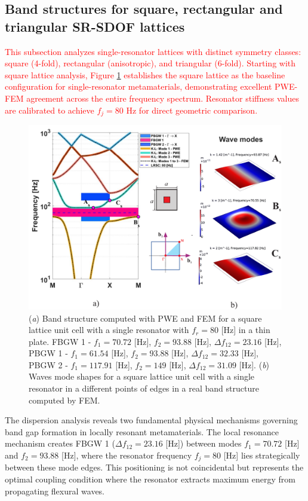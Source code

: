\documentclass[review,numbers,sort&compress]{elsarticle}
\begin{document}
\subsection{Band structures for square, rectangular and triangular SR-SDOF lattices}
\label{srt_disp_pwe}
\textcolor{red}{This subsection analyzes single-resonator lattices with distinct symmetry classes: square (4-fold), rectangular (anisotropic), and triangular (6-fold). Starting with square lattice analysis, Figure \ref{pwe_fem_disp_modal_square} establishes the square lattice as the baseline configuration for single-resonator metamaterials, demonstrating excellent PWE-FEM agreement across the entire frequency spectrum. Resonator stiffness values are calibrated to achieve $f_j = 80$ Hz for direct geometric comparison.}

\begin{figure}[htb]
	\centering
	\includegraphics[width=.8\textwidth]{1_1_disp_frf_square.pdf}
	\caption{(\textit{a}) Band structure computed with PWE and FEM for a square lattice unit cell with a single resonator with $f_r = 80$ [Hz] in a thin plate. FBGW 1 - $f_1 = 70.72$ [Hz], $f_2 = 93.88$ [Hz], $\Delta f_{12} = 23.16 $ [Hz], PBGW 1 - $f_1 = 61.54$ [Hz], $f_2 = 93.88$ [Hz], $\Delta f_{12} = 32.33 $ [Hz], PBGW 2 - $f_1 = 117.91$ [Hz], $f_2 = 149$ [Hz], $\Delta f_{12} = 31.09 $ [Hz]. (\textit{b}) Waves mode shapes for a square lattice unit cell with a single resonator in a different points of edges in a real band structure computed by FEM.}
	\label{pwe_fem_disp_modal_square}
\end{figure}
The dispersion analysis reveals two fundamental physical mechanisms governing band gap formation in locally resonant metamaterials. The local resonance mechanism creates FBGW 1 ($\Delta f_{12} = 23.16$ [Hz]) between modes $f_1 = 70.72$ [Hz] and $f_2 = 93.88$ [Hz], where the resonator frequency $f_j = 80$ [Hz] lies strategically between these mode edges. This positioning is not coincidental but represents the optimal coupling condition where the resonator extracts maximum energy from propagating flexural waves.
\end{document}
